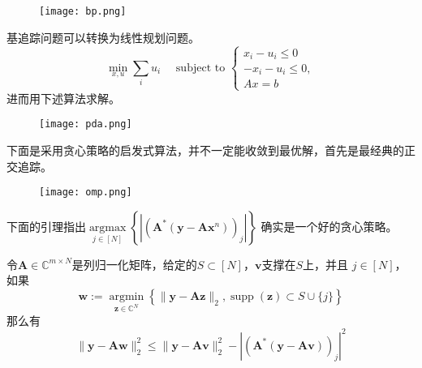 \begin{figure}[!htbp]
    \centering
    \texttt{[image: bp.png]}
\end{figure}
基追踪问题可以转换为线性规划问题。
\begin{equation}
    \min _{x, u} \sum_i u_i \quad \text { subject to } \begin{cases}
    x_i-u_i  \leq 0 \\
    -x_i-u_i  \leq 0, \\
    A x  =b
    \end{cases}
\end{equation}
进而用下述算法求解。\par
\begin{figure}[!htbp]
    \centering
    \texttt{[image: pda.png]}
\end{figure}
下面是采用贪心策略的启发式算法，并不一定能收敛到最优解，首先是最经典的正交追踪。\par
\begin{figure}[!htbp]
    \centering
    \texttt{[image: omp.png]}
\end{figure}
下面的引理指出$\underset{j \in[N]}{\operatorname{argmax}}\left\{\left|\left(\mathbf{A}^*\left(\mathbf{y}-\mathbf{A} \mathbf{x}^n\right)\right)_j\right|\right\}$
确实是一个好的贪心策略。
\begin{lemma}
    令$\mathbf{A} \in \mathbb{C}^{m \times N}$是列归一化矩阵，给定的$S \subset[N]$，$\mathbf{v}$支撑在$S$上，并且
    $j \in[N]$，如果
    \begin{equation}
        \mathbf{w}:=\underset{\mathbf{z} \in \mathbb{C}^N}{\operatorname{argmin}}\left\{\|\mathbf{y}-\mathbf{A z}\|_2, \operatorname{supp}(\mathbf{z}) \subset S \cup\{j\}\right\}
    \end{equation}
    那么有
    \begin{equation}
        \|\mathbf{y}-\mathbf{A} \mathbf{w}\|_2^2 \leq\|\mathbf{y}-\mathbf{A v}\|_2^2-\left|\left(\mathbf{A}^*(\mathbf{y}-\mathbf{A} \mathbf{v})\right)_j\right|^2
    \end{equation}
\end{lemma}
